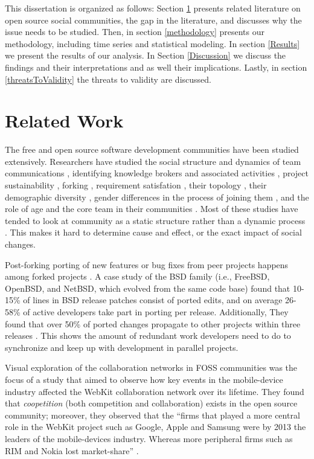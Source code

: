 \documentclass[12pt]{report}
\begin{document}
This dissertation is organized as follows: Section \ref{relatedwork} presents related literature on open source social communities, the gap in the literature, and discusses why the issue needs to be studied. Then, in section \ref{methodology} presents our methodology, including time series and statistical modeling. In section \ref{Results} we present the results of our analysis. In Section \ref{Discussion} we discuss the findings and their interpretations and as well their implications. Lastly, in section \ref{threatsToValidity} the threats to validity are discussed.

\section{Related Work}
\label{relatedwork}

The free and open source software development communities have been studied extensively. Researchers have studied the social structure and dynamics of team communications \cite{Bird}\cite{Guzzi}\cite{HowisonSocialDynamics}\cite{HowisonFlossMole}\cite{Nakakoji}, identifying knowledge brokers and associated activities \cite{Sowe}, project sustainability \cite{Nakakoji}\cite{NymanForkingSustainability}, forking \cite{NymanCodeForking}, requirement satisfation \cite{Ernst}, their topology \cite{Bird}, their demographic diversity \cite{Kunegis}, gender differences in the process of joining them \cite{Kuechler}, and the role of age and the core team in their communities \cite{AzarbakhtOSS2014}\cite{AzarbakhtINSNA2014}\cite{DavidsonVLHCC2014}\cite{Torres}. Most of these studies have tended to look at community as a static structure rather than a dynamic process \cite{CrowstonFLOSSWhatWeKnow}. This makes it hard to determine cause and effect, or the exact impact of social changes.

Post-forking porting of new features or bug fixes from peer projects happens among forked projects \cite{Baishakhi}. A case study of the BSD family (i.e., FreeBSD, OpenBSD, and NetBSD, which evolved from the same code base) found that 10-15\% of lines in BSD release patches consist of ported edits, and on average 26-58\% of active developers take part in porting per release. Additionally, They found that over 50\% of ported changes propagate to other projects within three releases \cite{Baishakhi}. This shows the amount of redundant work developers need to do to synchronize and keep up with development in parallel projects. 

Visual exploration of the collaboration networks in FOSS communities was the focus of a study that aimed to observe how key events in the mobile-device industry affected the WebKit collaboration network over its lifetime. \cite{JoseWebKit} They found that \textit{coopetition} (both competition and collaboration) exists in the open source community; moreover, they observed that the ``firms that played a more central role in the WebKit project such as Google, Apple and Samsung were by 2013 the leaders of the mobile-devices industry. Whereas more peripheral firms such as RIM and Nokia lost market-share'' \cite{JoseWebKit}. 
\end{document}
